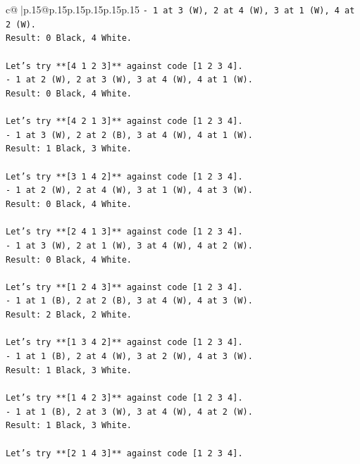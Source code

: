 \documentclass{article}
\begin{document}
{\begin{supertabular}{c@{$\;$}|p{.15\linewidth}@{}p{.15\linewidth}p{.15\linewidth}p{.15\linewidth}p{.15\linewidth}p{.15\linewidth}}
{{{\texttt{{-} 1 at 3 (W), 2 at 4 (W), 3 at 1 (W), 4 at 2 (W).} \\
\texttt{Result: 0 Black, 4 White.} \\
\\ 
\texttt{Let's try **{[}4 1 2 3{]}** against code {[}1 2 3 4{]}.} \\
\texttt{{-} 1 at 2 (W), 2 at 3 (W), 3 at 4 (W), 4 at 1 (W).} \\
\texttt{Result: 0 Black, 4 White.} \\
\\ 
\texttt{Let's try **{[}4 2 1 3{]}** against code {[}1 2 3 4{]}.} \\
\texttt{{-} 1 at 3 (W), 2 at 2 (B), 3 at 4 (W), 4 at 1 (W).} \\
\texttt{Result: 1 Black, 3 White.} \\
\\ 
\texttt{Let's try **{[}3 1 4 2{]}** against code {[}1 2 3 4{]}.} \\
\texttt{{-} 1 at 2 (W), 2 at 4 (W), 3 at 1 (W), 4 at 3 (W).} \\
\texttt{Result: 0 Black, 4 White.} \\
\\ 
\texttt{Let's try **{[}2 4 1 3{]}** against code {[}1 2 3 4{]}.} \\
\texttt{{-} 1 at 3 (W), 2 at 1 (W), 3 at 4 (W), 4 at 2 (W).} \\
\texttt{Result: 0 Black, 4 White.} \\
\\ 
\texttt{Let's try **{[}1 2 4 3{]}** against code {[}1 2 3 4{]}.} \\
\texttt{{-} 1 at 1 (B), 2 at 2 (B), 3 at 4 (W), 4 at 3 (W).} \\
\texttt{Result: 2 Black, 2 White.} \\
\\ 
\texttt{Let's try **{[}1 3 4 2{]}** against code {[}1 2 3 4{]}.} \\
\texttt{{-} 1 at 1 (B), 2 at 4 (W), 3 at 2 (W), 4 at 3 (W).} \\
\texttt{Result: 1 Black, 3 White.} \\
\\ 
\texttt{Let's try **{[}1 4 2 3{]}** against code {[}1 2 3 4{]}.} \\
\texttt{{-} 1 at 1 (B), 2 at 3 (W), 3 at 4 (W), 4 at 2 (W).} \\
\texttt{Result: 1 Black, 3 White.} \\
\\ 
\texttt{Let's try **{[}2 1 4 3{]}** against code {[}1 2 3 4{]}.} \\
}}}
\end{supertabular}}
\end{document}
